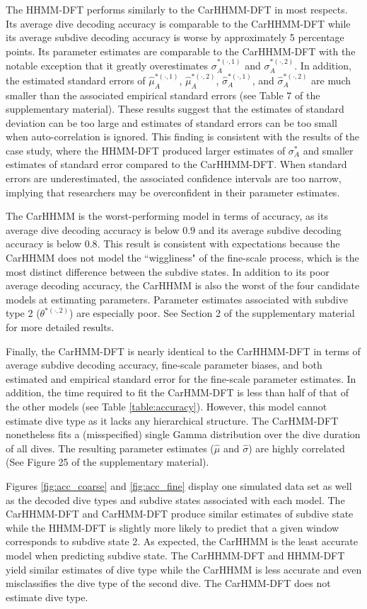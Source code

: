 The HHMM-DFT performs similarly to the CarHHMM-DFT in most respects. Its average dive decoding accuracy is comparable to the CarHHMM-DFT while its average subdive decoding accuracy is worse by approximately 5 percentage points. Its parameter estimates are comparable to the CarHHMM-DFT with the notable exception that it greatly overestimates $\sigma_A^{*(\cdot,1)}$ and $\sigma_A^{*(\cdot,2)}$. In addition, the estimated standard errors of $\hat \mu_A^{*(\cdot,1)}$, $\hat \mu_A^{*(\cdot,2)}$, $\hat \sigma_A^{*(\cdot,1)}$, and $\hat \sigma_A^{*(\cdot,2)}$ are much smaller than the associated empirical standard errors (see Table 7 of the supplementary material). These results suggest that the estimates of standard deviation can be too large and estimates of standard errors can be too small when auto-correlation is ignored. This finding is consistent with the results of the case study, where the HHMM-DFT produced larger estimates of $\sigma_A^*$ and smaller estimates of standard error compared to the CarHHMM-DFT. When standard errors are underestimated, the associated confidence intervals are too narrow, implying that researchers may be overconfident in their parameter estimates.

The CarHHMM is the worst-performing model in terms of accuracy, as its average dive decoding accuracy is below $0.9$ and its average subdive decoding accuracy is below $0.8$. This result is consistent with expectations because the CarHHMM does not model the ``wiggliness" of the fine-scale process, which is the most distinct difference between the subdive states. In addition to its poor average decoding accuracy, the CarHHMM is also the worst of the four candidate models at estimating parameters. Parameter estimates associated with subdive type 2 ($\theta^{*(\cdot,2)}$) are especially poor. See Section 2 of the supplementary material for more detailed results.

Finally, the CarHMM-DFT is nearly identical to the CarHHMM-DFT in terms of average subdive decoding accuracy, fine-scale parameter biases, and both estimated and empirical standard error for the fine-scale parameter estimates. In addition, the time required to fit the CarHMM-DFT is less than half of that of the other models (see Table \ref{table:accuracy}). However, this model cannot estimate dive type as it lacks any hierarchical structure. The CarHMM-DFT nonetheless fits a (misspecified) single Gamma distribution over the dive duration of all dives. The resulting parameter estimates ($\hat \mu$ and $\hat \sigma$) are highly correlated (See Figure 25 of the supplementary material).

Figures \ref{fig:acc_coarse} and \ref{fig:acc_fine} display one simulated data set as well as the decoded dive types and subdive states associated with each model. The CarHHMM-DFT and CarHMM-DFT produce similar estimates of subdive state while the HHMM-DFT is slightly more likely to predict that a given window corresponds to subdive state 2. As expected, the CarHHMM is the least accurate model when predicting subdive state. The CarHHMM-DFT and HHMM-DFT yield similar estimates of dive type while the CarHHMM is less accurate and even misclassifies the dive type of the second dive. The CarHMM-DFT does not estimate dive type.
